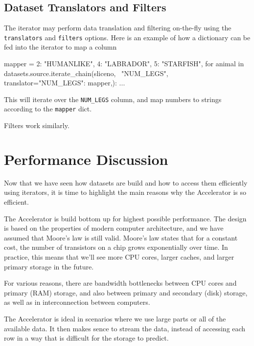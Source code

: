 \documentclass[a4paper]{article}
\begin{document}
\subsection{Dataset Translators and Filters}

The iterator may perform data translation and filtering on-the-fly
using the \texttt{translators} and \texttt{filters} options.  Here is
an example of how a dictionary can be fed into the iterator to map a
column
\begin{python}
  mapper = {2: "HUMANLIKE", 4: "LABRADOR", 5: "STARFISH",}
  for animal in datasets.source.iterate_chain(sliceno, \
     "NUM_LEGS", translator={"NUM_LEGS": mapper,}):
  ...
\end{python}
This will iterate over the \texttt{NUM\_LEGS} column, and map numbers
to strings according to the \texttt{mapper} dict.

Filters work similarly.



\clearpage

\section{Performance Discussion}
Now that we have seen how datasets are build and how to access them
efficiently using iterators, it is time to highlight the main reasons
why the Accelerator is so efficient.

The Accelerator is build bottom up for highest possible performance.
The design is based on the properties of modern computer architecture,
and we have assumed that Moore's law is still valid.  Moore's law
states that for a constant cost, the number of transistors on a chip
grows exponentially over time.  In practice, this means that we'll see
more CPU cores, larger caches, and larger primary storage in the
future.

For various reasons, there are bandwidth bottlenecks between CPU cores
and primary (RAM) storage, and also between primary and secondary
(disk) storage, as well as in interconnection between computers.

The Accelerator is ideal in scenarios where we use large parts or all
of the available data.  It then makes sence to stream the data,
instead of accessing each row in a way that is difficult for the
storage to predict.
\end{document}
